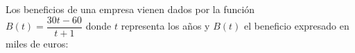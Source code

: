\documentclass[addpoints,spanish, 12pt,a4paper]{exam}
\begin{document}
\begin{questions}




\question  Los beneficios de una empresa vienen dados por la función \\ $B(t)=\dfrac{30t-60}{t+1}$ donde $t$  representa los años y $B(t)$ el beneficio expresado en miles de euros:
\end{questions}
\end{document}

